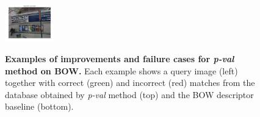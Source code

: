 \begin{figure}[t!]
\begin{minipage}{0.75\linewidth}
\begin{minipage}{\linewidth}
                \colorbox{myRed}{\includegraphics[trim = 35mm 30mm 35mm 30mm, clip=true, height=16mm]{imgs/Pval/exMix19/mix04.jpg}}
            \end{minipage} 
        \end{minipage}
        \caption{
            \textbf{Examples of improvements and failure cases for \emph{p-val} method on BOW.}
            Each example shows a query image (left) together with correct (green) and incorrect (red) matches from the database obtained by \emph{p-val} method (top) and the BOW descriptor baseline (bottom).       
        }
        \label{fig:images}
    \end{figure}
